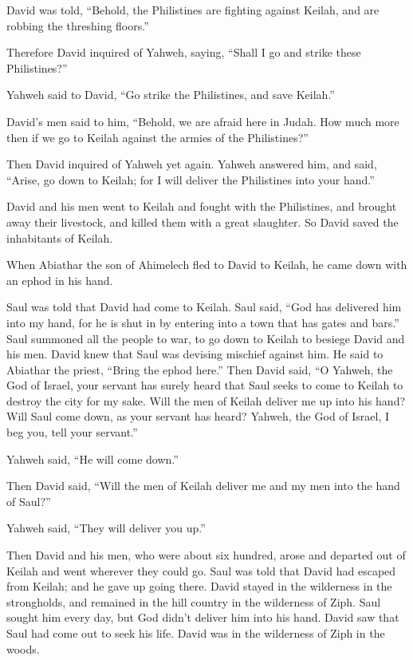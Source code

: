  David was told, ``Behold, the Philistines are fighting
against Keilah, and are robbing the threshing floors.''

 Therefore David inquired of Yahweh, saying, ``Shall I go
and strike these Philistines?''

Yahweh said to David, ``Go strike the Philistines, and save Keilah.''

 David's men said to him, ``Behold, we are afraid here in
Judah. How much more then if we go to Keilah against the armies of the
Philistines?''

 Then David inquired of Yahweh yet again. Yahweh answered
him, and said, ``Arise, go down to Keilah; for I will deliver the
Philistines into your hand.''

 David and his men went to Keilah and fought with the
Philistines, and brought away their livestock, and killed them with a
great slaughter. So David saved the inhabitants of Keilah.

 When Abiathar the son of Ahimelech fled to David to
Keilah, he came down with an ephod in his hand.

 Saul was told that David had come to Keilah. Saul said,
``God has delivered him into my hand, for he is shut in by entering into
a town that has gates and bars.''  Saul summoned all the
people to war, to go down to Keilah to besiege David and his men.
 David knew that Saul was devising mischief against him.
He said to Abiathar the priest, ``Bring the ephod here.''
 Then David said, ``O Yahweh, the God of Israel, your
servant has surely heard that Saul seeks to come to Keilah to destroy
the city for my sake.  Will the men of Keilah deliver me
up into his hand? Will Saul come down, as your servant has heard?
Yahweh, the God of Israel, I beg you, tell your servant.''

Yahweh said, ``He will come down.''

 Then David said, ``Will the men of Keilah deliver me and
my men into the hand of Saul?''

Yahweh said, ``They will deliver you up.''

 Then David and his men, who were about six hundred,
arose and departed out of Keilah and went wherever they could go. Saul
was told that David had escaped from Keilah; and he gave up going there.
 David stayed in the wilderness in the strongholds, and
remained in the hill country in the wilderness of Ziph. Saul sought him
every day, but God didn't deliver him into his hand. 
David saw that Saul had come out to seek his life. David was in the
wilderness of Ziph in the woods.


